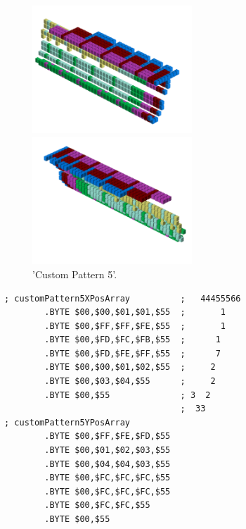 \begin{minipage}[b]{0.48\linewidth}
\begin{figure}[H]
    \centering
    \begin{adjustbox}{width=6cm,margin=0cm 0cm}
      \includegraphics[width=6cm]{src/patterns/pattern13-45.png}%
    \end{adjustbox}
    \begin{adjustbox}{width=6cm,margin=0cm -1.8cm}
      \includegraphics[width=6cm]{src/patterns/pattern13-225.png}%
    \end{adjustbox}
\caption{'Custom Pattern 5'.}
\end{figure}
\end{minipage}
\begin{minipage}[b]{0.48\linewidth}
\begin{lrbox}{\mybox}%
\begin{lstlisting}[basicstyle=\ttfamily\tiny]
; customPattern5XPosArray          ;   44455566
        .BYTE $00,$00,$01,$01,$55  ;       1   
        .BYTE $00,$FF,$FF,$FE,$55  ;       1   
        .BYTE $00,$FD,$FC,$FB,$55  ;      1    
        .BYTE $00,$FD,$FE,$FF,$55  ;      7    
        .BYTE $00,$00,$01,$02,$55  ;     2     
        .BYTE $00,$03,$04,$55      ;     2     
        .BYTE $00,$55              ; 3  2      
                                   ;  33       
; customPattern5YPosArray
        .BYTE $00,$FF,$FE,$FD,$55
        .BYTE $00,$01,$02,$03,$55
        .BYTE $00,$04,$04,$03,$55
        .BYTE $00,$FC,$FC,$FC,$55
        .BYTE $00,$FC,$FC,$FC,$55
        .BYTE $00,$FC,$FC,$55
        .BYTE $00,$55
\end{lstlisting}
\end{lrbox}%
\scalebox{0.8}{\usebox{\mybox}}

\end{minipage}
